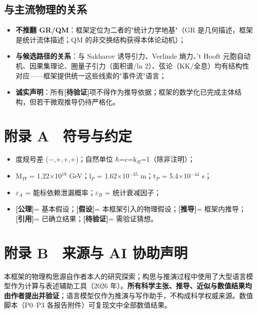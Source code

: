 \documentclass[UTF8,fontset=windows]{csoarticle}
\newcommand{\mtag}[1]{\textbf{[#1]}}
\newcommand{\up}[1]{\ensuremath{^{#1}}}
\newcommand{\down}[1]{\ensuremath{_{#1}}}
\begin{document}
\subsection{与主流物理的关系}

\begin{itemize}
\item \textbf{不推翻 GR/QM}：框架定位为二者的"统计力学地基"（GR 是几何描述，框架是统计流体描述；QM 的非交换结构获得本体论动机）；
\item \textbf{与候选路径的关系}：与 Sakharov 诱导引力、Verlinde 熵力、't Hooft 元胞自动机、因果集理论、圈量子引力（面积谱/ln 2）、弦论（KK/全息）均有结构性对应------框架提供统一这些线索的"事件流"语言；
\item \textbf{诚实声明}：所有\mtag{待验证}项不得作为推导依据；框架的数学化已完成主体结构，但若干微观推导仍待严格化。
\end{itemize}



\section*{附录 A　符号与约定}

\begin{itemize}
\item 度规号差 (\ensuremath{-},+,+,+)；自然单位 \ensuremath{\hbar}=c=k\down{B}=1（除非注明）；
\item M\down{Pl} = 1.22\ensuremath{\times}10\up{19} GeV；l\down{P} = 1.62\ensuremath{\times}10\up{-35} m；t\down{P} = 5.4\ensuremath{\times}10\up{-44} s；
\item \ensuremath{\varepsilon}\down{A} = 能标依赖泄漏概率；\ensuremath{\varepsilon}\down{B} = 统计衰减因子；
\item \mtag{公理}= 基本假设；\mtag{假设}= 本框架引入的物理假设；\mtag{推导}= 框架内推导；\mtag{引用}= 已确立结果；\mtag{待验证}= 需验证猜想。
\end{itemize}

\section*{附录 B　来源与 AI 协助声明}

本框架的物理构思源自作者本人的研究探索；构思与推演过程中使用了大型语言模型作为计算与表述辅助工具（2026 年）。\textbf{所有科学主张、推导、近似与数值结果均由作者提出并验证}；语言模型仅作为推演与写作助手，不构成科学权威来源。数值脚本（P0--P3 各报告附件）可复现文中全部数值结果。
\end{document}
